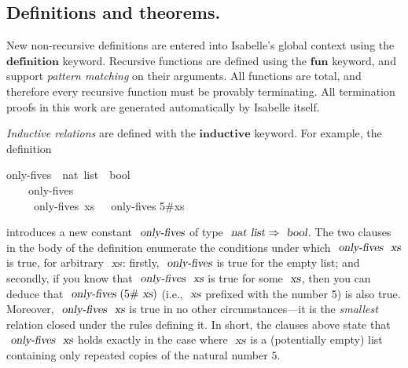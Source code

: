 \subsection{Definitions and theorems.}

New non-recursive definitions are entered into Isabelle's global context using the $\mathbf{definition}$ keyword.
Recursive functions are defined using the $\mathbf{fun}$ keyword, and support \emph{pattern matching} on their arguments.
All functions are total, and therefore every recursive function must be provably terminating.
All termination proofs in this work are generated automatically by Isabelle itself.

\emph{Inductive relations} are defined with the $\mathbf{inductive}$ keyword.
For example, the definition
\begin{isabelle}
 only-fives\ {\isacharcolon}{\isacharcolon}\ {\isachardoublequoteopen}nat\ list\ {\isasymRightarrow}\ bool{\isachardoublequoteclose}\  \\
~~~~{\isachardoublequoteopen}only-fives\ {\isacharbrackleft}{\isacharbrackright}{\isachardoublequoteclose}\ {\isacharbar}\\
~~~~{\isachardoublequoteopen}{\isasymlbrakk}\ only-fives\ xs\ {\isasymrbrakk}\ {\isasymLongrightarrow}\ only-fives {\isacharparenleft}5\#xs{\isacharparenright}{\isachardoublequoteclose}
\end{isabelle}
\noindent %
introduces a new constant $\isa{only-fives}$ of type $\isa{nat list} \Rightarrow \isa{bool}$.
The two clauses in the body of the definition enumerate the conditions under which $\isa{only-fives}\ \isa{xs}$ is true, for arbitrary $\isa{xs}$: firstly, $\isa{only-fives}$ is true for the empty list; and secondly, if you know that $\isa{only-fives}\ \isa{xs}$ is true for some $\isa{xs}$, then you can deduce that $\isa{only-fives}\ (5\#\isa{xs})$ (i.e., $\isa{xs}$ prefixed with the number 5) is also true.
Moreover, $\isa{only-fives}\ \isa{xs}$ is true in no other circumstances---it is the \emph{smallest} relation closed under the rules defining it.
In short, the clauses above state that $\isa{only-fives}\ \isa{xs}$ holds exactly in the case where $\isa{xs}$ is a (potentially empty) list containing only repeated copies of the natural number $5$.

